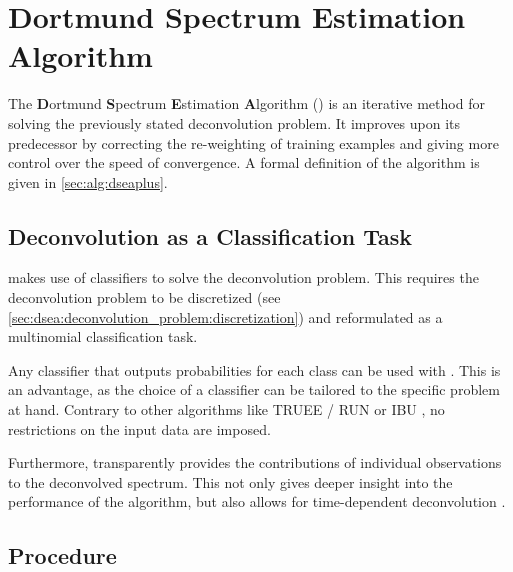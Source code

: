 \section{Dortmund Spectrum Estimation Algorithm} \label{sec:dsea:dsea}
The \textbf{D}ortmund \textbf{S}pectrum \textbf{E}stimation \textbf{A}lgorithm
  (\dsea{})
  \cite{dsea_unification}
is an iterative method for solving the previously stated deconvolution problem.
It improves upon its predecessor \dseanonplus{} \cite{dsea_tim} by
  correcting the re-weighting of training examples and
  giving more control over the speed of convergence.
%
A formal definition of the \dseaplus{} algorithm is given in \autoref{sec:alg:dseaplus}.


\subsection{Deconvolution as a Classification Task} %
\dsea{} makes use of classifiers to solve the deconvolution problem.
This requires the deconvolution problem to be
  discretized (see \autoref{sec:dsea:deconvolution_problem:discretization})
  and reformulated as a multinomial classification task.

Any classifier that outputs probabilities for each class
  can be used with \dsea{}.
This is an advantage,
  as the choice of a classifier can be tailored to the specific problem at hand.
Contrary to other algorithms like
  \ac{TRUEE} / \ac{RUN} \cite{milke2013} or
  \ac{IBU} \cite{dagostini1995, dagostini2010},
no restrictions on the input data are imposed.

Furthermore,
\dsea{} transparently provides the contributions of individual observations to the deconvolved spectrum.
This not only gives deeper insight into the performance of the algorithm,
but also allows for time-dependent deconvolution \cite{dsea_mirko}. %


\clearpage %
\subsection{Procedure}



